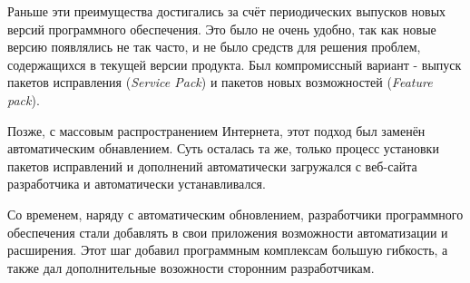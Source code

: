Раньше эти преимущества достигались за счёт периодических выпусков новых версий программного обеспечения. Это было не очень удобно, так как новые версию появлялись не так часто, и не было средств для решения проблем, содержащихся в текущей версии продукта. Был компромиссный вариант - выпуск пакетов исправления ({\it Service Pack}) и пакетов новых возможностей ({\it Feature pack}). 

Позже, с массовым распространением Интернета, этот подход был заменён автоматическим обнавлением. Суть осталась та же, только процесс установки пакетов исправлений и дополнений автоматически загружался с веб-сайта разработчика и автоматически устанавливался. 

Со временем, наряду с автоматическим обновлением, разработчики программного обеспечения стали добавлять в свои приложения возможности автоматизации и расширения. Этот шаг добавил программным комплексам большую гибкость, а также дал дополнительные возожности сторонним разработчикам. 

\pagebreak